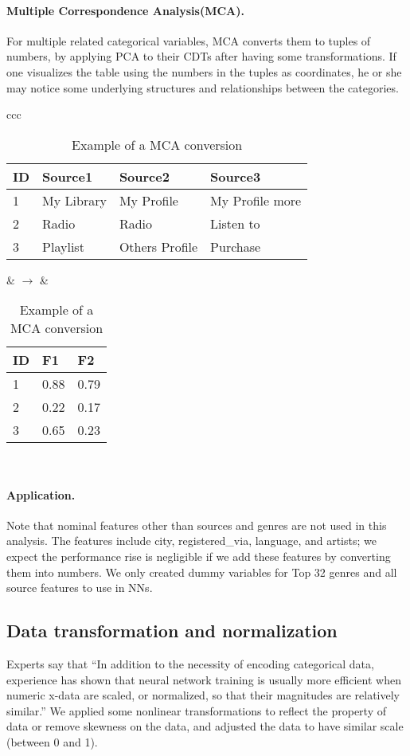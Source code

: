 \documentclass{article}
\begin{document}
\paragraph{Multiple Correspondence Analysis(MCA).}
For multiple related categorical variables, MCA converts them to tuples of
numbers, by applying PCA to their CDTs after having some transformations.
If one visualizes the table using the numbers in the tuples as coordinates, he
or she may notice some underlying structures and relationships between the categories.
\begin{table}[!h]
\centering
\begin{tabular}{ccc}
\begin{tabular}{|l|l|l|l|}
\hline \rowcolor[HTML]{C0C0C0}
ID & Source1 & Source2 & Source3 \\\hline \rowcolor[HTML]{FFFFFF}
1 & My Library & My Profile & My Profile more \\\hline
2 & Radio & Radio & Listen to \\\hline
3 & Playlist & Others Profile & Purchase \\\hline
\end{tabular}
& $\rightarrow$ &
\begin{tabular}{|l|l|l|}
\hline \rowcolor[HTML]{C0C0C0}
ID & F1 & F2 \\\hline \rowcolor[HTML]{FFFFFF}
1 & 0.88 & 0.79 \\\hline
2 & 0.22 & 0.17 \\\hline
3 & 0.65 & 0.23 \\\hline
\end{tabular}
\\
\end{tabular}
\caption{Example of a MCA conversion}
\label{table:mca}
\end{table}
\paragraph{Application.}
Note that nominal features other than sources and genres are not used in this
analysis. The features include city, registered\_via, language, and artists; we
expect the performance rise is negligible if we add these features by converting
them into numbers. We only created dummy variables for Top 32 genres and all
source features to use in NNs.

\subsection{Data transformation and normalization}
Experts say that ``In addition to the necessity of encoding categorical data,
experience has shown that neural network training is usually more efficient when
numeric x-data are scaled, or normalized, so that their magnitudes are
relatively similar.''\cite{WEBSITE:NNDataStandardize}
We applied some nonlinear transformations to reflect the property of data or remove
skewness on the data, and adjusted the data to have similar scale (between 0 and
1).
\end{document}
